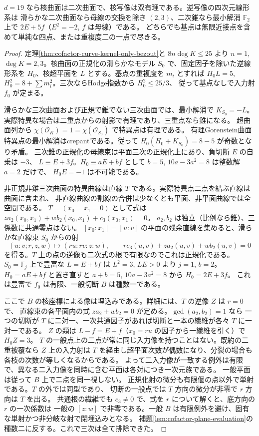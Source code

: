 \begin{theorem}\label{thm:cofactor-nineteen-surface}
$d=19$ なら核曲面は二次曲面で、核写像は双有理である。逆写像の四次元線形系は
滑らかな二次曲面なら母線の交換を除き $(2,3)$、二次錐なら最小解消
$\mathbb F_2$ 上で $2E+5f$（$E^2=-2$, $f$ は母線）である。
どちらでも基点は無限近接点を含めて単純な四点、または重複度二の一点で尽きる。
\end{theorem}
\begin{proof}
定理\ref{thm:cofactor-curve-kernel-only-bezout}と $8n\deg K\le25$ より
$n=1$, $\deg K=2,3$。核曲面の正規化の滑らかなモデル $S_0$ で、固定因子を除いた逆線形系を
$H_0$、核超平面を $L$ とする。基点の重複度を $m_i$ とすれば
$H_0L=5$, $H_0^2=8+\sum m_i^2$。三次ならHodge指数から $H_0^2\le25/3$、
従って基点なしで入力射 $f_0$ が定まる。

滑らかな三次曲面および正規で錐でない三次曲面では、最小解消で $K_{S_0}=-L$。
実際特異な場合は二重点からの射影で有理であり、三重点なら錐になる。
超曲面列から $\chi(\mathcal O_K)=1=\chi(\mathcal O_{S_0})$ で特異点は有理である。
有理Gorenstein曲面特異点の最小解消はcrepantである。従って $H_0(H_0+K_{S_0})=8-5$ が奇数となり矛盾。
三次錐の正規化の母線束は平面三次の正規化上にあり、負切断 $E$ の自乗は $-3$、
$L\equiv E+3f$。$H_0\equiv aE+bf$ として $b=5$, $10a-3a^2=8$ は整数解 $a=2$ だけで、
$H_0E=-1$ は不可能である。

非正規非錐三次曲面の特異曲線は直線 $T$ である。実際特異点二点を結ぶ直線は曲面に含まれ、
非直線曲線の割線の合併は少なくとも平面、非平面曲線では全空間である。
$T=(x_0=x_1=0)$ として式は $za_2(x_0,x_1)+wb_2(x_0,x_1)+c_3(x_0,x_1)=0$。
$a_2,b_2$ は独立（比例なら錐）、三係数に共通零点はない。
$[x_0:x_1]=[u:v]$ の平面の残余直線を集めると、滑らかな直線束 $S_0$ からの射
\[
 (u:v; r,z,w)\longmapsto(ru:rv:z:w),\qquad
 r c_3(u,v)+z a_2(u,v)+w b_2(u,v)=0
\]
を得る。$T$ 上の点の逆像も二次式の根で有限なのでこれは正規化である。
$S_0=\mathbb F_j$ 上で豊富な $L=E+bf$ は $L^2=3$, $LE>0$ より $j=1$, $b=2$。
$H_0=aE+bf$ と置き直すと $a+b=5$, $10a-3a^2=8$ から $H_0=2E+3f$。
これは豊富で $f_0$ は有限、一般切断 $B$ は種数一である。

ここで $B$ の核座標による像は埋込みである。詳細には、$T$ の逆像 $Z$ は $r=0$ で、
直線束の各平面内の式 $za_2+wb_2=0$ が定める。$\gcd(a_2,b_2)=1$ なら
一つの切断が $T$ に二対一、一次共通因子があれば切断と一本の繊維が各々 $T$ に一対一である。
$Z$ の類は $L-f=E+f$（$x_0=ru$ の因子から一繊維を引く）で $H_0 Z=3$。
$T$ の一般点上の二点が常に同じ入力像を持つことはない。既約の二重被覆なら
$Z$ 上の入力射は $T$ を経由し超平面次数が偶数になり、分裂の場合も各枝の次数が等しくなるからである。
よって二入力像が一致する例外は有限で、異なる二入力像を同時に含む平面は各対につき一次元族である。
一般平面は従って $B$ 上で二点を同一視しない。
正規化射の微分も有限個の点以外で単射である。$T$ の外では同型であり、
切断の一般点では $T$ 方向の微分が非零で $r$ 方向は $T$ を出る。
共通根の繊維でも $c_3\ne0$ で、式を $r$ について解くと、底方向の $r$ の一次係数は
一般の $[z:w]$ で非零である。一般 $B$ は有限例外を避け、固有な単射かつ非分岐な射で閉埋込みとなる。
補題\ref{lem:cofactor-plane-evaluation}の種数二に反する。これで三次は全て排除できた。


\end{proof}
